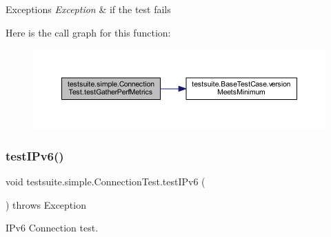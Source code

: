 \begin{DoxyExceptions}{Exceptions}
{\em Exception} & if the test fails \\
\hline
\end{DoxyExceptions}
Here is the call graph for this function\+:
\nopagebreak
\begin{figure}[H]
\begin{center}
\leavevmode
\includegraphics[width=350pt]{classtestsuite_1_1simple_1_1_connection_test_a3efc92c350b402367a66355fe3305381_cgraph}
\end{center}
\end{figure}
\mbox{\label{classtestsuite_1_1simple_1_1_connection_test_aaac71a7d7f1811f8ca555a3f8fb2573b}} 
\subsubsection{\texorpdfstring{test\+I\+Pv6()}{testIPv6()}}
{\footnotesize\ttfamily void testsuite.\+simple.\+Connection\+Test.\+test\+I\+Pv6 (\begin{DoxyParamCaption}{ }\end{DoxyParamCaption}) throws Exception}

I\+Pv6 Connection test.


